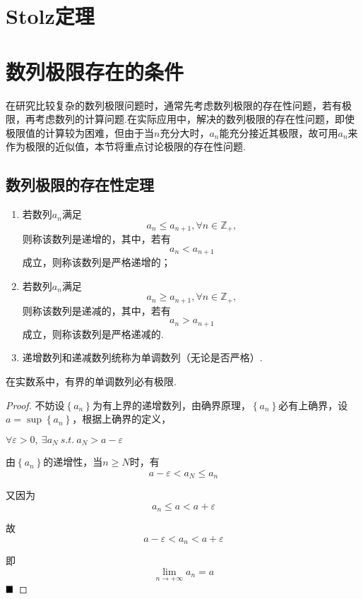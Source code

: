 \section{Stolz定理}


\section{数列极限存在的条件}
在研究比较复杂的数列极限问题时，通常先考虑数列极限的存在性问题，若有极限，再考虑数列的计算问题.在实际应用中，解决的数列极限的存在性问题，即使极限值的计算较为困难，但由于当$n$充分大时，$a_n$能充分接近其极限，故可用$a_n$来作为极限的近似值，本节将重点讨论极限的存在性问题.
\subsection{数列极限的存在性定理}
\begin{definition}[数列的单调性]
	\begin{enumerate}
		\item 若数列$a_n$满足$$a_n\leqslant a_{n+1},\forall n\in \mathbb{Z}_+,$$则称该数列是{\heiti 递增}的，其中，若有$$a_n<a_{n+1}$$成立，则称该数列是{\heiti 严格递增}的；
		\item 若数列$a_n$满足$$a_n\geqslant a_{n+1},\forall n\in \mathbb{Z}_+,$$则称该数列是{\heiti 递减}的，其中，若有$$a_n>a_{n+1}$$成立，则称该数列是{\heiti 严格递减}的.
		\item 递增数列和递减数列统称为{\heiti 单调}数列（无论是否严格）.
	\end{enumerate}
\end{definition}
\begin{theorem}[单调有界收敛定理]
	在实数系中，有界的单调数列必有极限.
\end{theorem}
\begin{proof}
	不妨设$\left\{a_n\right\}$为有上界的递增数列，由确界原理，$\left\{a_n\right\}$必有上确界，设$a=\sup \left\{a_n\right\}$，根据上确界的定义，
	
	$\forall \varepsilon>0,\ \exists a_N \ s.t.\ a_N>a-\varepsilon$
	
	由$\left\{a_n\right\}$的递增性，当$n\geqslant N$时，有
	$$a-\varepsilon<a_N\leqslant a_n$$
	
	又因为$$a_n\leqslant a<a+\varepsilon$$
	
	故$$a-\varepsilon<a_n<a+\varepsilon$$
	
	即$${\lim_{n \to +\infty}a_n}=a$$
	$\hfill\blacksquare$
\end{proof}

